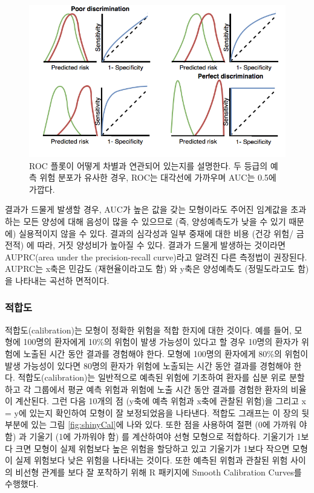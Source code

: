 \documentclass[11pt]{book}
\theoremstyle{definition}
\theoremstyle{definition}
\theoremstyle{definition}
\theoremstyle{remark}
\begin{document}
\begin{figure}
\includegraphics[width=1\linewidth]{images/PatientLevelPrediction/theory/roctheory} \caption{ROC 플롯이 어떻게 차별과 연관되어 있는지를 설명한다. 두 등급의 예측 위험 분포가 유사한 경우, ROC는 대각선에 가까우며 AUC는 0.5에 가깝다.}\label{fig:figuretheoryroctheory}
\end{figure}

결과가 드물게 발생할 경우, AUC가 높은 값을 갖는 모형이라도 주어진
임계값을 초과하는 모든 양성에 대해 음성이 많을 수 있으므로 (즉,
양성예측도가 낮을 수 있기 때문에) 실용적이지 않을 수 있다. 결과의
심각성과 일부 중재에 대한 비용 (건강 위험/ 금전적) 에 따라, 거짓
양성비가 높아질 수 있다. 결과가 드물게 발생하는 것이라면 AUPRC(area
under the precision-recall curve)라고 알려진 다른 측정법이 권장된다.
AUPRC는 x축은 민감도 (재현율이라고도 함) 와 y축은 양성예측도
(정밀도라고도 함) 을 나타내는 곡선하 면적이다.

\subsubsection*{적합도}

적합도(calibration)는 모형이 정확한 위험을 적합 한지에 대한 것이다. 예를
들어, 모형에 100명의 환자에게 10\%의 위험이 발생 가능성이 있다고 할 경우
10명의 환자가 위험에 노출된 시간 동안 결과를 경험해야 한다. 모형에
100명의 환자에게 80\%의 위험이 발생 가능성이 있다면 80명의 환자가 위험에
노출되는 시간 동안 결과를 경험해야 한다. 적합도(calibration)는
일반적으로 예측된 위험에 기초하여 환자를 십분 위로 분할하고 각 그룹에서
평균 예측 위험과 위험에 노출 시간 동안 결과를 경험한 환자의 비율이
계산된다. 그런 다음 10개의 점 (y축에 예측 위험과 x축에 관찰된 위험)을
그리고 x = y에 있는지 확인하여 모형이 잘 보정되었음을 나타낸다. 적합도
그래프는 이 장의 뒷부분에 있는 그림 \ref{fig:shinyCal}에 나와 있다. 또한
점을 사용하여 절편 (0에 가까워 야 함) 과 기울기 (1에 가까워야 함) 를
계산하여야 선형 모형으로 적합하다. 기울기가 1보다 크면 모형이 실제
위험보다 높은 위험을 할당하고 있고 기울기가 1보다 작으면 모형이 실제
위험보다 낮은 위험을 나타내는 것이다. 또한 예측된 위험과 관찰된 위험
사이의 비선형 관계를 보다 잘 포착하기 위해 R 패키지에 Smooth Calibration
Curves를 수행했다. 
\end{document}
